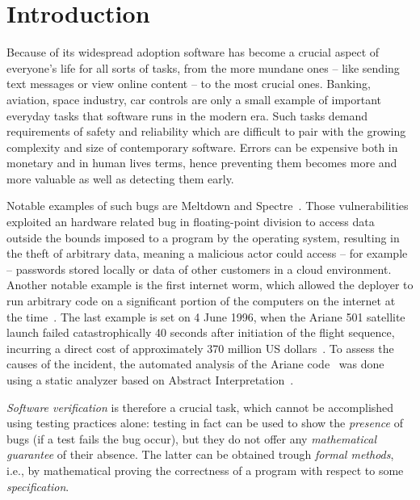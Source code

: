 \chapter*{Introduction}\label{ch:intro}

Because of its widespread adoption software has become a crucial
aspect of everyone's life for all sorts of tasks, from the more
mundane ones -- like sending text messages or view online content --
to the most crucial ones. Banking, aviation, space industry, car
controls are only a small example of important everyday tasks that
software runs in the modern era. Such tasks demand requirements of
safety and reliability which are difficult to pair with the growing
complexity and size of contemporary software. Errors can be expensive
both in monetary and in human lives terms, hence preventing them
becomes more and more valuable as well as detecting them early.

\medskip

Notable examples of such bugs are Meltdown and
Spectre~\cite{art:meltdown,art:spectre}. Those vulnerabilities
exploited an hardware related bug in floating-point division to access
data outside the bounds imposed to a program by the operating system,
resulting in the theft of arbitrary data, meaning a malicious actor
could access -- for example -- passwords stored locally or data of
other customers in a cloud environment.  Another notable example is
the first internet worm, which allowed the deployer to run arbitrary
code on a significant portion of the computers on the internet at the
time~\cite{art:worm1,art:worm2,art:worm3,art:worm4}.  The last example
is set on 4 June 1996, when the Ariane 501 satellite launch failed
catastrophically 40 seconds after initiation of the flight sequence,
incurring a direct cost of approximately 370 million US
dollars~\cite{10.1145/251880.251992}. To assess the causes of the
incident, the automated analysis of the Ariane
code~\cite{art:arianecode} was done using a static analyzer based on
Abstract Interpretation~\cite{art:arianeabstract}.

\medskip

\emph{Software verification} is therefore a crucial task, which cannot
be accomplished using testing practices alone: testing in fact can be
used to show the \emph{presence} of bugs (if a test fails the bug
occur), but they do not offer any \emph{mathematical guarantee} of
their absence. The latter can be obtained trough \emph{formal
  methods}, i.e., by mathematical proving the correctness of a program
with respect to some \emph{specification}.


